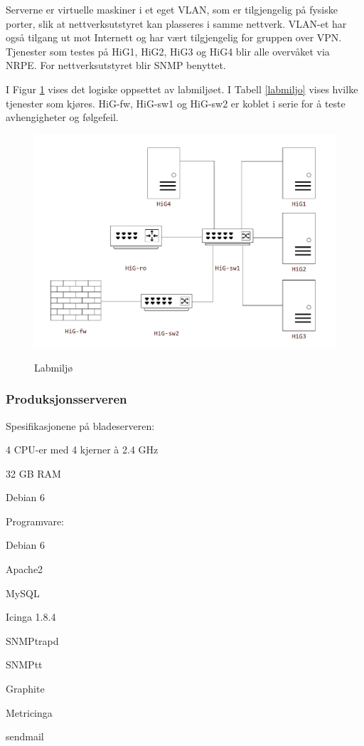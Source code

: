 Serverne er virtuelle maskiner i et eget VLAN, som er tilgjengelig på fysiske porter, slik at nettverksutstyret kan plasseres i samme nettverk. VLAN-et har også tilgang ut mot Internett og har vært tilgjengelig for gruppen over VPN. Tjenester som testes på HiG1, HiG2, HiG3 og HiG4 blir alle overvåket via NRPE. For nettverksutstyret blir SNMP benyttet.

I Figur \ref{laboppsett} vises det logiske oppsettet av labmiljøet. I Tabell \ref{labmiljo} vises hvilke tjenester som kjøres. HiG-fw, HiG-sw1 og HiG-sw2 er koblet i serie for å teste avhengigheter og følgefeil.

\begin{figure}[H]
    \centering
    \includegraphics[scale=0.4]{img/labmiljo}
	\label{laboppsett}
    \caption{Labmiljø}
\end{figure}


\subsubsection{Produksjonsserveren}
Spesifikasjonene på bladeserveren:
\begin{itemize*}
\item 4 CPU-er med 4 kjerner à 2.4 GHz
\item 32 GB RAM
\item Debian 6
\end{itemize*}
Programvare:
\begin{itemize*}
\item Debian 6
\item Apache2
\item MySQL
\item Icinga 1.8.4
\item SNMPtrapd
\item SNMPtt
\item Graphite
\item Metricinga 
\item sendmail
\end{itemize*}

